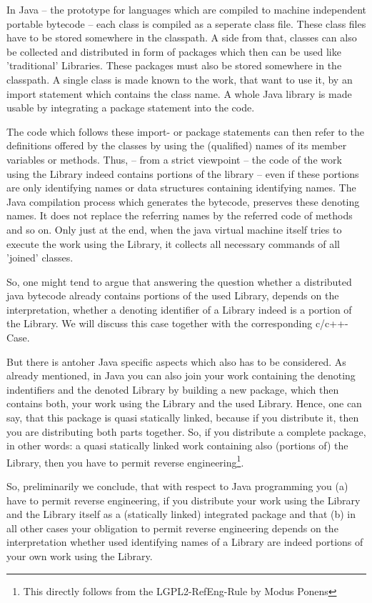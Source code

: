 In Java -- the prototype for languages which are compiled to machine independent
portable bytecode -- each class is compiled as a seperate class file. These
class files have to be stored somewhere in the classpath. A side from that,
classes can also be collected and distributed in form of packages which then can
be used like 'traditional' Libraries. These packages must also be stored
somewhere in the classpath. A single class is made known to the work, that want
to use it, by an import statement which contains the class name. A whole Java
library is made usable by integrating a package statement into the code.

The code which follows these import- or package statements can then refer to the
definitions offered by the classes by using the (qualified) names of its member
variables or methods. Thus, -- from a strict viewpoint -- the code of the work
using the Library indeed contains portions of the library -- even if these
portions are only identifying names or data structures containing identifying
names. The Java compilation process which generates the bytecode, preserves
these denoting names. It does not replace the referring names by the referred
code of methods and so on. Only just at the end, when the java virtual machine
itself tries to execute the work using the Library, it collects all necessary
commands of all 'joined' classes.

So, one might tend to argue that answering the question whether a distributed
java bytecode already contains portions of the used Library, depends on the
interpretation, whether a denoting identifier of a Library indeed is a portion
of the Library. We will discuss this case together with the corresponding
c/c++-Case. 

But there is antoher Java specific aspects which also has to be considered. As
already mentioned, in Java you can also join your work containing the denoting
indentifiers and the denoted Library by building a new package, which then
contains both, your work using the Library and the used Library. Hence, one can
say, that this package is quasi statically linked, because if you distribute it,
then you are distributing both parts together. So, if you distribute a complete
package, in other words: a quasi statically linked work containing also
(portions of) the Library, then you have to permit reverse
engineering\footnote{This directly follows from the LGPL2-RefEng-Rule by Modus
Ponens}.

So, preliminarily we conclude, that with respect to Java programming you (a)
have to permit reverse engineering, if you distribute your work using the
Library and the Library itself as a (statically linked) integrated package and
that (b) in all other cases your obligation to permit reverse engineering
depends on the interpretation whether used identifying names of a Library are
indeed portions of your own work using the Library.


